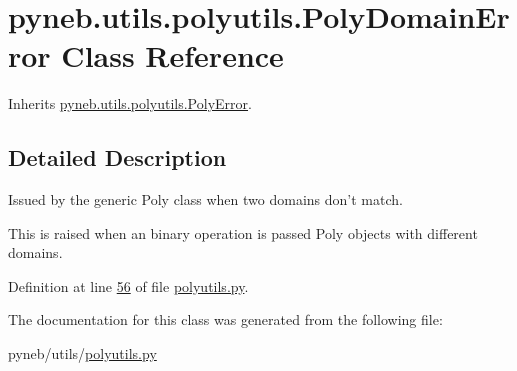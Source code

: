 \hypertarget{classpyneb_1_1utils_1_1polyutils_1_1_poly_domain_error}{}\section{pyneb.\+utils.\+polyutils.\+Poly\+Domain\+Error Class Reference}
\label{classpyneb_1_1utils_1_1polyutils_1_1_poly_domain_error}


Inherits \hyperlink{classpyneb_1_1utils_1_1polyutils_1_1_poly_error}{pyneb.\+utils.\+polyutils.\+Poly\+Error}.



\subsection{Detailed Description}
\begin{DoxyVerb}Issued by the generic Poly class when two domains don't match.

This is raised when an binary operation is passed Poly objects with
different domains.\end{DoxyVerb}
 

Definition at line \hyperlink{polyutils_8py_source_l00056}{56} of file \hyperlink{polyutils_8py_source}{polyutils.\+py}.



The documentation for this class was generated from the following file\+:\begin{DoxyCompactItemize}
\item 
pyneb/utils/\hyperlink{polyutils_8py}{polyutils.\+py}\end{DoxyCompactItemize}
